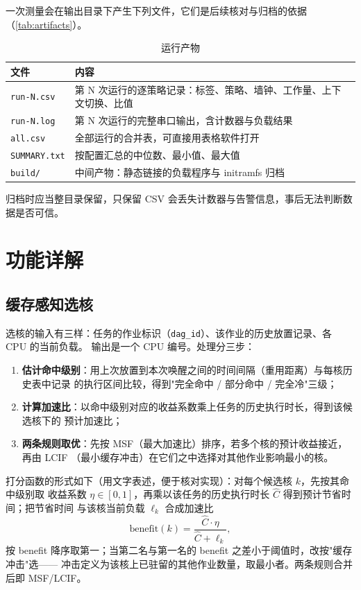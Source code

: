 \documentclass[11pt,a4paper]{article}
\newcommand{\code}[1]{\texttt{#1}}
\begin{document}
一次测量会在输出目录下产生下列文件，它们是后续核对与归档的依据（\autoref{tab:artifacts}）。

\begin{table}[H]
\centering
\caption{运行产物}
\label{tab:artifacts}
\small
\begin{tabular}{@{}p{4.6cm}p{9.4cm}@{}}
\toprule
文件 & 内容 \\
\midrule
\code{run-N.csv} & 第 N 次运行的逐策略记录：标签、策略、墙钟、工作量、上下文切换、比值 \\
\code{run-N.log} & 第 N 次运行的完整串口输出，含计数器与负载结果 \\
\code{all.csv} & 全部运行的合并表，可直接用表格软件打开 \\
\code{SUMMARY.txt} & 按配置汇总的中位数、最小值、最大值 \\
\code{build/} & 中间产物：静态链接的负载程序与 initramfs 归档 \\
\bottomrule
\end{tabular}
\end{table}

归档时应当整目录保留，只保留 CSV 会丢失计数器与告警信息，事后无法判断数据是否可信。

\section{功能详解}

\subsection{缓存感知选核}

选核的输入有三样：任务的作业标识（\code{dag\_id}）、该作业的历史放置记录、各 CPU 的当前负载。
输出是一个 CPU 编号。处理分三步：

\begin{enumerate}
  \item \textbf{估计命中级别}：用上次放置到本次唤醒之间的时间间隔（重用距离）与每核历史表中记录
        的执行区间比较，得到"完全命中 / 部分命中 / 完全冷"三级；
  \item \textbf{计算加速比}：以命中级别对应的收益系数乘上任务的历史执行时长，得到该候选核下的
        预计加速比；
  \item \textbf{两条规则取优}：先按 MSF（最大加速比）排序，若多个核的预计收益接近，再由 LCIF
        （最小缓存冲击）在它们之中选择对其他作业影响最小的核。
\end{enumerate}

打分函数的形式如下（用文字表述，便于核对实现）：对每个候选核 $k$，先按其命中级别取
收益系数 $\eta\in[0,1]$，再乘以该任务的历史执行时长 $\hat{C}$ 得到预计节省时间；把节省时间
与该核当前负载 $\ell_k$ 合成加速比
\[ \mathrm{benefit}(k)=\frac{\hat{C}\cdot\eta}{\hat{C}+\ell_k}, \]
按 benefit 降序取第一；当第二名与第一名的 benefit 之差小于阈值时，改按"缓存冲击"选——
冲击定义为该核上已驻留的其他作业数量，取最小者。两条规则合并后即 MSF/LCIF。
\end{document}
